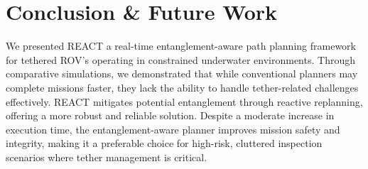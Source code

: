 
\section{Conclusion & Future Work}
\label{sec:conclusion}
We presented \ac{REACT} a real-time entanglement-aware path planning framework for tethered \ac{ROV}'s operating in constrained underwater environments. Through comparative simulations, we demonstrated that while conventional planners may complete missions faster, they lack the ability to handle tether-related challenges effectively. \ac{REACT} mitigates potential entanglement through reactive replanning, offering a more robust and reliable solution. Despite a moderate increase in execution time, the entanglement-aware planner improves mission safety and integrity, making it a preferable choice for high-risk, cluttered inspection scenarios where tether management is critical. 







